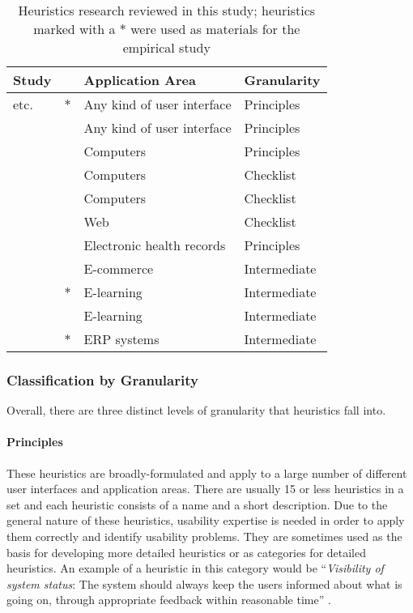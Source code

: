 \begin{table}[hbtp]
	\vspace{0.5cm}
	\centering
	\caption[Heuristics research reviewed in this study]{Heuristics research reviewed in this study; heuristics marked with a $\ast$ were used as materials for the empirical study}
	\begin{tabular}{llll} \toprule
		\textbf{Study} 					& 	& \textbf{Application Area}  & \textbf{Granularity} \\ \midrule
		\citet{Molich1990} etc. &	$\ast$ & Any kind of user interface & Principles 	\\
		\citet{Norman2002} 			& 	& Any kind of user interface & Principles 	\\
		\citet{Perlman1997}			&	& Computers									 & Principles 	\\
		\citet{Weiss1994} 			& 	& Computers 								 & Checklist		\\
		\citet{Pierotti1995} 		& 	& Computers 								 & Checklist		\\
		\citet{Leavitt2006} 		& 	& Web 											 & Checklist		\\
		\citet{Zhang2011}				& 	& Electronic health records	 & Principles		\\
		\citet{Petre2006} 			& 	& E-commerce 								 & Intermediate	\\
		\citet{Ardito2006}			& $\ast$	& E-learning								 & Intermediate	\\
		\citet{Oztekin2010}			& 	& E-learning								 & Intermediate	\\
		\citet{Singh2009}				& $\ast$	& ERP systems								 & Intermediate	\\
		\bottomrule
	\end{tabular}
	\label{tab:heuristics_lr}
\end{table}

\subsubsection{Classification by Granularity}
Overall, there are three distinct levels of granularity that heuristics fall into.

\paragraph{Principles} These heuristics are broadly-formulated and apply to a large number of different user interfaces and application areas. There are usually 15 or less heuristics in a set and each heuristic consists of a name and a short description. Due to the general nature of these heuristics, usability expertise is needed in order to apply them correctly and identify usability problems. They are sometimes used as the basis for developing more detailed heuristics or as categories for detailed heuristics. An example of a heuristic in this category would be ``\textit{Visibility of system status}: The system should always keep the users informed about what is going on, through appropriate feedback within reasonable time'' \citep{Nielsen1994a}.

